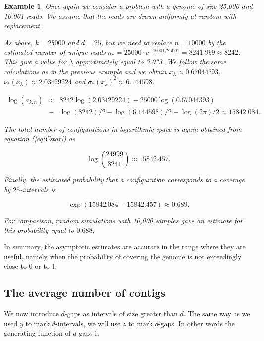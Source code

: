 \documentclass{article}
\newtheorem{example}{Example}
\begin{document}
\begin{example}

Once again we consider a problem with a genome of size 25,000 and 10,001
reads. We assume that the reads are drawn uniformly at random with
replacement.

As above, $k=25000$ and $d=25$, but we need to replace $n=10000$ by the
estimated number of unique reads $n_* = 25000 \cdot e^{-10001/25001} =
8241.999 \approx 8242$. This give a value for $\lambda$ approximately
equal to 3.033. We follow the same calculations as in the previous example
and we obtain $x_\lambda \approx 0.67044393$, $\nu_*(x_\lambda) \approx
2.03429224$ and $\sigma_*(x_\lambda)^2 \approx 6.144598$.

\begin{eqnarray*}
\log(a_{k,n}) &\approx& 8242\log(2.03429224) - 25000\log(0.67044393) \\
&-& \log(8242)/2 - \log(6.144598)/2 - \log(2\pi)/2
\approx 15842.084.
\end{eqnarray*}

The total number of configurations in logarithmic space is again
obtained from equation (\ref{eq:Cstar}) as

\begin{equation*}
\log { 24999 \choose 8241 } \approx 15842.457.
\end{equation*}

Finally, the estimated probability that a configuration corresponds to a
coverage by $25$-intervals is

\begin{equation*}
\exp(15842.084-15842.457) \approx 0.689.
\end{equation*}

For comparison, random simulations with 10,000 samples gave an estimate
for this probability equal to $0.688$.

\end{example}

In summary, the asymptotic estimates are accurate in the range where they
are useful, namely when the probability of covering the genome is not
exceedingly close to 0 or to 1.

\subsection{The average number of contigs}
\label{sec:av}

We now introduce $d$-gaps as intervals of size greater than $d$. The same
way as we used $y$ to mark $d$-intervals, we will use $z$ to mark
$d$-gaps. In other words the generating function of $d$-gaps is
\end{document}
